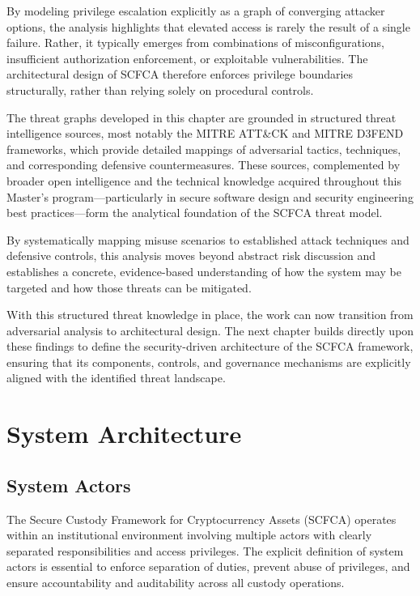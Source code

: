 \documentclass[12pt,a4paper]{report}
\begin{document}
By modeling privilege escalation explicitly as a graph of converging attacker options, the analysis highlights that elevated access is rarely the result of a single failure. Rather, it typically emerges from combinations of misconfigurations, insufficient authorization enforcement, or exploitable vulnerabilities. The architectural design of SCFCA therefore enforces privilege boundaries structurally, rather than relying solely on procedural controls.

The threat graphs developed in this chapter are grounded in structured threat intelligence sources, most notably the MITRE ATT\&CK and MITRE D3FEND frameworks, which provide detailed mappings of adversarial tactics, techniques, and corresponding defensive countermeasures. These sources, complemented by broader open intelligence and the technical knowledge acquired throughout this Master's program—particularly in secure software design and security engineering best practices—form the analytical foundation of the SCFCA threat model. 

By systematically mapping misuse scenarios to established attack techniques and defensive controls, this analysis moves beyond abstract risk discussion and establishes a concrete, evidence-based understanding of how the system may be targeted and how those threats can be mitigated. 

With this structured threat knowledge in place, the work can now transition from adversarial analysis to architectural design. The next chapter builds directly upon these findings to define the security-driven architecture of the SCFCA framework, ensuring that its components, controls, and governance mechanisms are explicitly aligned with the identified threat landscape.



\chapter{System Architecture}
\section{System Actors}
The Secure Custody Framework for Cryptocurrency Assets (SCFCA) operates within an institutional environment involving multiple actors with clearly separated responsibilities and access privileges. The explicit definition of system actors is essential to enforce separation of duties, prevent abuse of privileges, and ensure accountability and auditability across all custody operations.
\end{document}
